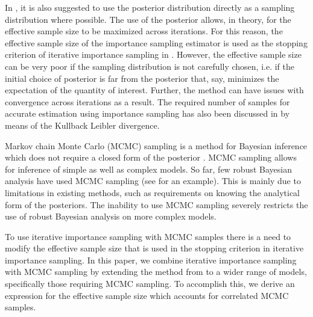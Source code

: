\documentclass{amsart}
\theoremstyle{plain}%
\begin{document}
In \citep{Troffaes_2018}, it is also suggested to use the posterior distribution directly as a sampling distribution where possible. 
The use of the posterior allows, in theory, for the effective sample size to be maximized 
across iterations.
For this reason, the effective sample size of the importance sampling estimator is used as the stopping criterion of iterative importance sampling in \citep{Troffaes_2018}. 
However, the effective sample size can be very poor if the sampling distribution is not 
carefully chosen, i.e. if the initial choice of posterior is far from the posterior that, say, minimizes the expectation of the quantity of interest. Further, the method can have issues with convergence across iterations as a result.
The required number of samples for accurate estimation using importance sampling has also been discussed in \citep{Agapiou_2017, Chatterjee_2018, Sanz_2018} by means of the Kullback Leibler divergence.

Markov chain Monte Carlo (MCMC) sampling is a
method for Bayesian inference which does not require a closed form of the posterior \citep{Brooks_2011, Gelman_2013}. MCMC sampling allows for inference of simple as well as complex models. So far, few robust Bayesian analysis have used MCMC sampling (see \citep{Vernon_2017} for an example). This is mainly due to limitations in existing methods, such as requirements on knowing the analytical form of the posteriors. The inability to use MCMC sampling severely restricts the use of robust Bayesian analysis on more complex models.

To use iterative importance sampling with MCMC samples there is a need to modify the effective sample size that is used in the stopping criterion in iterative importance sampling. In this paper, we combine iterative importance sampling with MCMC sampling by extending the method from \citep{Troffaes_2017, Troffaes_2018} to a wider range of models, specifically those requiring MCMC sampling. To accomplish this, we derive an expression for the effective sample size which accounts for correlated MCMC samples. 
\end{document}
